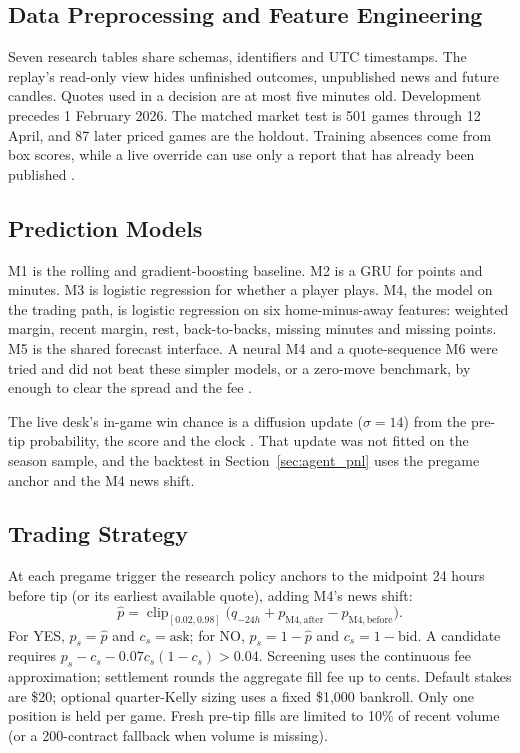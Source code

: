 \documentclass[11pt,a4paper]{article}
\newcommand{\code}[1]{\path{#1}}
\begin{document}
\subsection{Data Preprocessing and Feature Engineering}
Seven research tables share schemas, identifiers and UTC timestamps. The
replay's read-only \code{AsOf} view hides unfinished outcomes, unpublished
news and future candles. Quotes used in a decision are at most five minutes
old. Development precedes 1 February 2026. The matched market test is 501
games through 12 April, and 87 later priced games are the holdout. Training
absences come from box scores, while a live override can use only a report
that has already been published \cite{data-models,walkforward}.

\subsection{Prediction Models}
M1 is the rolling and gradient-boosting baseline. M2 is a GRU for points and
minutes. M3 is logistic regression for whether a player plays. M4, the model
on the trading path, is logistic regression on six home-minus-away features:
weighted margin, recent margin, rest, back-to-backs, missing minutes and
missing points. M5 is the shared forecast interface. A neural M4 and a
quote-sequence M6 were tried and did not beat these simpler models, or a
zero-move benchmark, by enough to clear the spread and the fee
\cite{data-models,neural-audit}.

The live desk's in-game win chance is a diffusion update ($\sigma=14$) from
the pre-tip probability, the score and the clock \cite{implementation}. That
update was not fitted on the season sample, and the backtest in
Section~\ref{sec:agent_pnl} uses the pregame anchor and the M4 news shift.

\subsection{Trading Strategy}
\label{subsec:strategy}
At each pregame trigger the research policy anchors to the midpoint 24 hours
before tip (or its earliest available quote), adding M4's news shift:
\begin{equation}
\widehat p=\operatorname{clip}_{[0.02,0.98]}
\big(q_{-24h}+p_{\mathrm{M4,after}}-p_{\mathrm{M4,before}}\big).
\label{eq:anchor}
\end{equation}
For YES, $p_s=\widehat p$ and $c_s=\mathrm{ask}$; for NO,
$p_s=1-\widehat p$ and $c_s=1-\mathrm{bid}$. A candidate requires
$p_s-c_s-0.07c_s(1-c_s)>0.04$. Screening uses the continuous fee approximation;
settlement rounds the aggregate fill fee up to cents. Default stakes are \$20;
optional quarter-Kelly sizing uses a fixed \$1,000 bankroll. Only one position
is held per game. Fresh pre-tip fills are limited to 10\% of recent volume
(or a 200-contract fallback when volume is missing).
\end{document}
